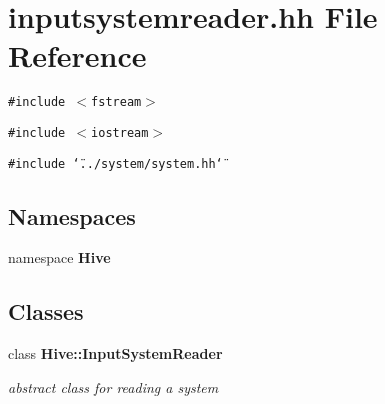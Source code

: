 \section{inputsystemreader.hh File Reference}
\label{inputsystemreader_8hh}


{\tt \#include $<$fstream$>$}\par
{\tt \#include $<$iostream$>$}\par
{\tt \#include \char`\"{}../system/system.hh\char`\"{}}\par
\subsection*{Namespaces}
\begin{CompactItemize}
\item 
namespace {\bf Hive}
\end{CompactItemize}
\subsection*{Classes}
\begin{CompactItemize}
\item 
class {\bf Hive::InputSystemReader}
\begin{CompactList}\small\item\em abstract class for reading a system \item\end{CompactList}\end{CompactItemize}
